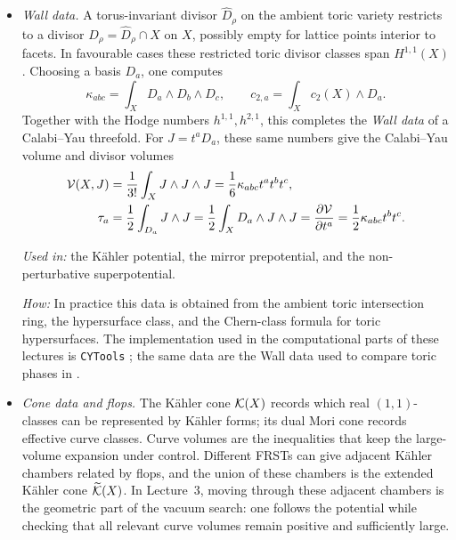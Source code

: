\begin{itemize}[leftmargin=*]
    \item \emph{Wall data.}
	A torus-invariant divisor
    $\widehat D_\rho$ on the ambient toric variety restricts to a
    divisor $D_\rho=\widehat D_\rho\cap X$ on
    $X$, possibly empty for lattice points interior to facets.
    In favourable cases these restricted toric divisor classes span
    $H^{1,1}(X)$. Choosing a basis $D_a$, one computes
    \begin{equation}
        \kappa_{abc}=\int_X D_a\wedge D_b\wedge D_c,
        \qquad
        c_{2,a}=\int_X c_2(X)\wedge D_a .
    \end{equation}
    Together with the Hodge numbers $h^{1,1},h^{2,1}$, this completes the \emph{Wall data} of a Calabi--Yau threefold.
    For $J=t^aD_a$, these same numbers give the Calabi--Yau volume
    and divisor volumes
    \begin{equation}
        \begin{aligned}
        \mathcal{V}(X,J)
            &=
            \frac{1}{3!}\int_X J\wedge J\wedge J
            =
            \frac16\kappa_{abc}t^at^bt^c,\\
        \tau_a
            &=
            \frac12\int_{D_a} J\wedge J
            =
            \frac12\int_X D_a\wedge J\wedge J
            =
            \frac{\partial \mathcal{V}}{\partial t^a}
            =
            \frac12\kappa_{abc}t^bt^c .
        \end{aligned}
    \end{equation}

    \par\smallskip
    \noindent\emph{Used in:} the K\"ahler potential, the mirror prepotential, 
    and the non-perturbative superpotential.

    \par\noindent\emph{How:} In practice this data is obtained from the ambient
    toric intersection ring, the hypersurface class, and the
    Chern-class formula for toric hypersurfaces.  The implementation
    used in the computational parts of these lectures is
    \texttt{CYTools} \cite{Demirtas:2022hqf}; the same data are the
    Wall data used to compare toric phases in
    \cite{Gendler:2023ujl}.

    \item \emph{Cone data and flops.}
    The K\"ahler cone $\mathcal{K}(X)$ records which real $(1,1)$-classes
    can be represented by K\"ahler forms; its dual Mori cone records
    effective curve classes. Curve volumes are the inequalities that
    keep the large-volume expansion under control. Different FRSTs
    can give adjacent K\"ahler chambers related by flops, and the
    union of these chambers is the extended K\"ahler cone
    $\widetilde{\mathcal{K}}(X)$. In Lecture~3, moving through these adjacent chambers
    is the geometric part of the vacuum search: one follows the
    potential while checking that all relevant curve volumes remain
    positive and sufficiently large.


\end{itemize}
